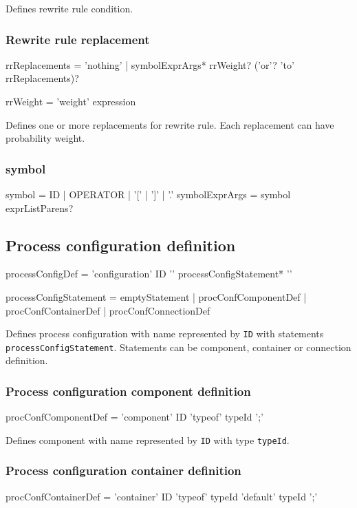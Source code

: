 Defines rewrite rule condition.


\subsubsection{Rewrite rule replacement}
\begin{Grammar}
rrReplacements = 'nothing'
	| symbolExprArgs* rrWeight? ('or'? 'to' rrReplacements)?

rrWeight = 'weight' expression
\end{Grammar}

Defines one or more replacements for rewrite rule.
Each replacement can have probability weight.



\subsubsection{\lsystem symbol}
\begin{Grammar}
symbol = ID | OPERATOR | '[' | ']' | '.'
symbolExprArgs = symbol exprListParens?
\end{Grammar}


\subsection{Process configuration definition}
\begin{Grammar}
processConfigDef = 'configuration' ID '{' processConfigStatement* '}'

processConfigStatement = emptyStatement
	| procConfComponentDef
	| procConfContainerDef
	| procConfConnectionDef
\end{Grammar}

Defines process configuration with name represented by \texttt{ID} with statements \texttt{processConfigStatement}.
Statements can be component, container or connection definition.


\subsubsection{Process configuration component definition}
\begin{Grammar}
procConfComponentDef = 'component' ID 'typeof' typeId ';'
\end{Grammar}

Defines component with name represented by \texttt{ID} with type \texttt{typeId}.


\subsubsection{Process configuration container definition}
\begin{Grammar}
procConfContainerDef =
	'container' ID 'typeof' typeId 'default' typeId ';'
\end{Grammar}


